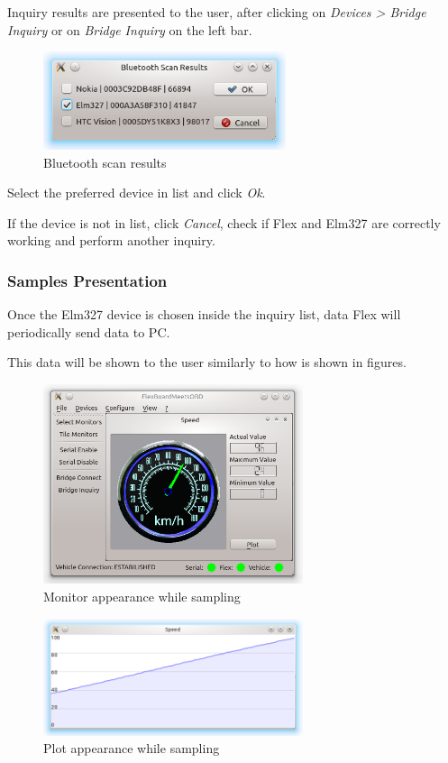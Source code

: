 \documentclass[twoside]{article}
\begin{document}
\begin{multicols}{2}
Inquiry results are presented to the user, after clicking on \emph{Devices > Bridge Inquiry} or on \emph{Bridge Inquiry} on the left bar.

\begin{figure}[H]
  \centering
  \includegraphics[width=2.8in]{img/GUI/bluetooth_scan_results}
  \caption{Bluetooth scan results}
\end{figure}

Select the preferred device in list and click \emph{Ok}.

If the device is not in list, click \emph{Cancel}, check if Flex and Elm327 are correctly working and perform another inquiry.

\subsubsection{Samples Presentation}

Once the Elm327 device is chosen inside the inquiry list, data Flex will periodically send data to PC.

This data will be shown to the user similarly to how is shown in figures.

\begin{figure}[H]
  \centering
  \includegraphics[width=3in]{img/GUI/sampling_monitor}
  \caption{Monitor appearance while sampling}
\end{figure}

\begin{figure}[H]
  \centering
  \includegraphics[width=3in]{img/GUI/sampling_plot}
  \caption{Plot appearance while sampling}
\end{figure}


\end{multicols}
\end{document}
